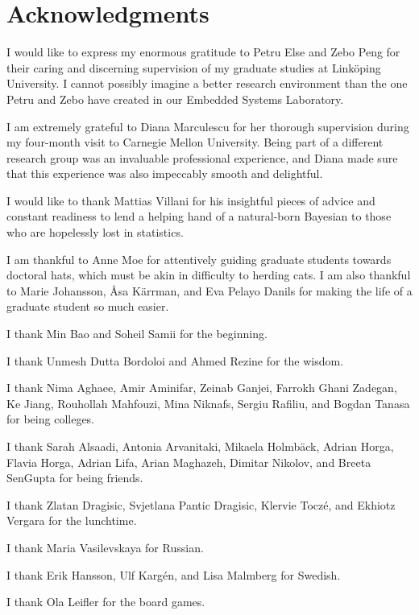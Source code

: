 \chapter*{Acknowledgments}
\newcommand\person[2]{#2 #1}

I would like to express my enormous gratitude to \person{Else}{Petru} and
\person{Peng}{Zebo} for their caring and discerning supervision of my graduate
studies at Linköping University. I cannot possibly imagine a better research
environment than the one Petru and Zebo have created in our Embedded Systems
Laboratory.

I am extremely grateful to \person{Marculescu}{Diana} for her thorough
supervision during my four-month visit to Carnegie Mellon University. Being part
of a different research group was an invaluable professional experience, and
Diana made sure that this experience was also impeccably smooth and delightful.

I would like to thank \person{Villani}{Mattias} for his insightful pieces of
advice and constant readiness to lend a helping hand of a natural-born Bayesian
to those who are hopelessly lost in statistics.

I am thankful to \person{Moe}{Anne} for attentively guiding graduate students
towards doctoral hats, which must be akin in difficulty to herding cats. I am
also thankful to \person{Johansson}{Marie}, \person{Kärrman}{Åsa}, and
\person{Pelayo Danils}{Eva} for making the life of a graduate student so much
easier.

I thank
\person{Bao}{Min} and
\person{Samii}{Soheil}
for the beginning.

I thank
\person{Dutta Bordoloi}{Unmesh} and
\person{Rezine}{Ahmed}
for the wisdom.

I thank
\person{Aghaee}{Nima},
\person{Aminifar}{Amir},
\person{Ganjei}{Zeinab},
\person{Ghani Zadegan}{Farrokh},
\person{Jiang}{Ke},
\person{Mahfouzi}{Rouhollah},
\person{Niknafs}{Mina},
\person{Rafiliu}{Sergiu}, and
\person{Tanasa}{Bogdan}
for being colleges.

I thank
\person{Alsaadi}{Sarah},
\person{Arvanitaki}{Antonia},
\person{Holmbäck}{Mikaela},
\person{Horga}{Adrian},
\person{Horga}{Flavia},
\person{Lifa}{Adrian},
\person{Maghazeh}{Arian},
\person{Nikolov}{Dimitar}, and
\person{SenGupta}{Breeta}
for being friends.

I thank
\person{Dragisic}{Zlatan},
\person{Pantic Dragisic}{Svjetlana},
\person{Toczé}{Klervie}, and
\person{Vergara}{Ekhiotz}
for the lunchtime.

I thank
\person{Vasilevskaya}{Maria}
for Russian.

I thank
\person{Hansson}{Erik},
\person{Kargén}{Ulf}, and
\person{Malmberg}{Lisa}
for Swedish.

I thank
\person{Leifler}{Ola}
for the board games.
